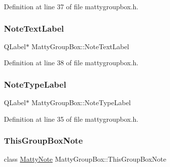 Definition at line 37 of file mattygroupbox.\+h.

\hypertarget{classMattyGroupBox_a2243d04d95c060e516fa3a43f09f19ef}{}\label{classMattyGroupBox_a2243d04d95c060e516fa3a43f09f19ef} 
\subsubsection{\texorpdfstring{Note\+Text\+Label}{NoteTextLabel}}
{\footnotesize\ttfamily Q\+Label$\ast$ Matty\+Group\+Box\+::\+Note\+Text\+Label\hspace{0.3cm}{\ttfamily [private]}}



Definition at line 38 of file mattygroupbox.\+h.

\hypertarget{classMattyGroupBox_a7bd564ef71ea2331a316d2fc6792ef09}{}\label{classMattyGroupBox_a7bd564ef71ea2331a316d2fc6792ef09} 
\subsubsection{\texorpdfstring{Note\+Type\+Label}{NoteTypeLabel}}
{\footnotesize\ttfamily Q\+Label$\ast$ Matty\+Group\+Box\+::\+Note\+Type\+Label\hspace{0.3cm}{\ttfamily [private]}}



Definition at line 35 of file mattygroupbox.\+h.

\hypertarget{classMattyGroupBox_a00ca2ef39a0b5aca9e83373777bed395}{}\label{classMattyGroupBox_a00ca2ef39a0b5aca9e83373777bed395} 
\subsubsection{\texorpdfstring{This\+Group\+Box\+Note}{ThisGroupBoxNote}}
{\footnotesize\ttfamily class \hyperlink{classMattyNote}{Matty\+Note} Matty\+Group\+Box\+::\+This\+Group\+Box\+Note\hspace{0.3cm}{\ttfamily [private]}}




